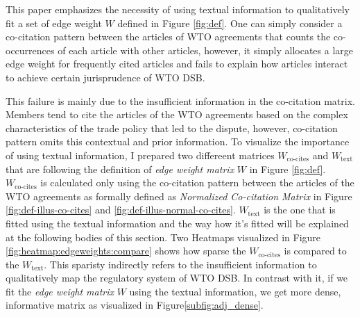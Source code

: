 This paper emphasizes the necessity of using textual information 
to qualitatively fit a set of edge weight $W$ defined in Figure \ref{fig:def}. %
One can simply consider a co-citation pattern between the articles of WTO agreements that counts the co-occurrences of each article with other articles, however,
it simply allocates a large edge weight for frequently cited articles and fails to explain how articles interact to achieve certain jurisprudence of WTO DSB. %

This failure is mainly due to the insufficient information in the co-citation matrix. Members tend to cite the articles of 
the WTO agreements based on the complex characteristics of 
the trade policy that led to the dispute, however, co-citation pattern omits this contextual and prior information. To visualize the importance of using textual information, I prepared two differeent matrices $W_{\text{co-cites}}$ and $W_{\text{text}}$ that are following the definition of \textit{edge weight matrix} $W$ in Figure \ref{fig:def}.
$W_{\text{co-cites}}$ is calculated only using the co-citation pattern between the articles of the WTO agreements as formally defined as \textit{Normalized Co-citation Matrix} in Figure \ref{fig:def-illus-co-cites} and \ref{fig:def-illus-normal-co-cites}. 
$W_{\text{text}}$ is the one that is fitted using the textual information and the way how it's fitted will be explained at the following bodies of this section.
Two Heatmaps visualized in Figure \ref{fig:heatmap:edgeweights:compare} shows how sparse the $W_{\text{co-cites}}$ is compared to the $W_{\text{text}}$. This sparisty indirectly refers to the insufficient information
to qualitatively map the regulatory system of WTO DSB. 
In contrast with it, if we fit the \textit{edge weight matrix} $W$ using the textual information, we get more dense, informative matrix as visualized in Figure\ref{subfig:adj_dense}.





